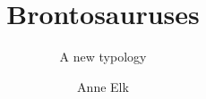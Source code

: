 \author{Anne Elk}
\title{Brontosauruses}
\subtitle{A new typology}
\renewcommand{\lsSeries}{sidl}
\renewcommand{\lsSeriesNumber}{}
